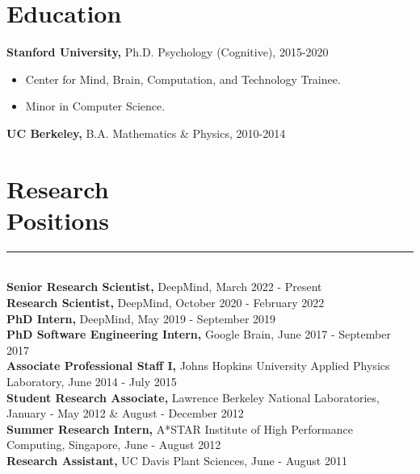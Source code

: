 \documentclass[margin]{res}
\begin{document}
 
 
 
\address{{\bf Email} \\ andrewlampinen@gmail.com}
\address{{\bf Website} \\\url{https://lampinen.github.io}}
\begin{resume} 
\section{Education} 
{\bf Stanford University,} Ph.D. Psychology (Cognitive), 2015-2020
\begin{itemize} \itemsep -2pt \item Center for Mind, Brain, Computation, and Technology Trainee. \item Minor in Computer Science.\end{itemize}
{\bf UC Berkeley,}  B.A. Mathematics \& Physics, 2010-2014%
\vspace{1pt}\section{Research\\Positions} \vspace{-15pt} \rule{\textwidth}{0.5pt} \\[3pt]
{\bf Senior Research Scientist,} DeepMind, March 2022 - Present\\[0.1em] 
{\bf Research Scientist,} DeepMind, October 2020 - February 2022\\[0.1em]
{\bf PhD Intern,} DeepMind, May 2019 - September 2019\\[0.1em]
{\bf PhD Software Engineering Intern,} Google Brain, June 2017 - September 2017\\[0.1em]
{\bf Associate Professional Staff I,} Johns Hopkins University Applied Physics Laboratory, June 2014 - July 2015\\[0.1em] 
{\bf Student Research Associate,} Lawrence Berkeley National Laboratories, January - May 2012 \& August - December 2012\\[0.1em]
{\bf Summer Research Intern,} A*STAR Institute of High Performance Computing, Singapore, June - August 2012\\[0.1em]
{\bf Research Assistant,} UC Davis Plant Sciences, June - August 2011
\vspace{1pt}

\end{resume}
\end{document}
